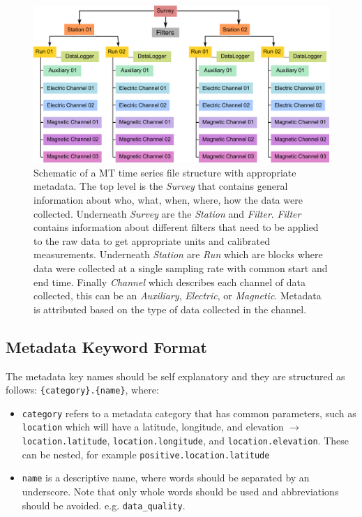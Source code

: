 \documentclass{article}
\begin{document}
\begin{figure}[htb!]
	\centering
	\includegraphics[height=.525\textwidth]{example_mt_file_structure.pdf}
	\caption{Schematic of a MT time series file structure with appropriate metadata. The top level is the \textit{Survey} that contains general information about who, what, when, where, how the data were collected.  Underneath \textit{Survey} are the \textit{Station} and \textit{Filter}.  \textit{Filter} contains information about different filters that need to be applied to the raw data to get appropriate units and calibrated measurements.  Underneath \textit{Station} are \textit{Run} which are blocks where data were collected at a single sampling rate with common start and end time. Finally \textit{Channel} which describes each channel of data collected, this can be an \textit{Auxiliary}, \textit{Electric}, or \textit{Magnetic}.  Metadata is attributed based on the type of data collected in the channel.}
	\label{fig:example}
\end{figure}

\subsection{Metadata Keyword Format}

The metadata key names should be self explanatory and they are structured as follows: \verb|{category}.{name}|, where:
\begin{itemize}
	\item \verb|category| refers to a metadata category that has common parameters, such as \verb|location| which will have a latitude, longitude, and elevation $\longrightarrow$ \verb|location.latitude|, \verb|location.longitude|, and \verb|location.elevation|.  These can be nested, for example \verb|positive.location.latitude|
	\item \verb|name| is a descriptive name, where words should be separated by an underscore. Note that only whole words should be used and abbreviations should be avoided. e.g. \verb|data_quality|.  
\end{itemize}  
\end{document}
